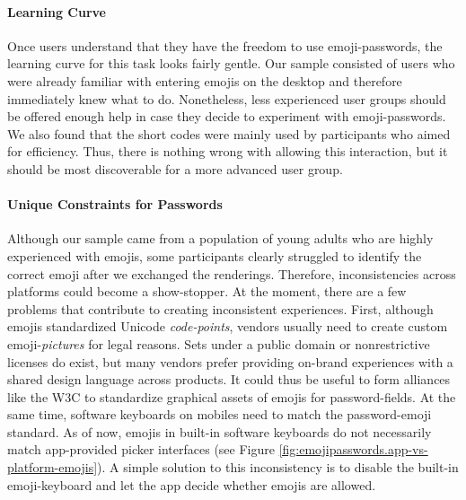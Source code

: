 \paragraph{Learning Curve} Once users understand that they have the freedom to use emoji-passwords, the learning curve for this task looks fairly gentle. Our sample consisted of users who were already familiar with entering emojis on the desktop and therefore immediately knew what to do. Nonetheless, less experienced user groups should be offered enough help in case they decide to experiment with emoji-passwords. We also found that the short codes were mainly used by participants who aimed for efficiency. Thus, there is nothing wrong with allowing this interaction, but it should be most discoverable for a more advanced user group. 


\paragraph{Unique Constraints for Passwords}\label{sec:emojipasswords:unique-constraints} 

Although our sample came from a population of young adults who are highly experienced with emojis, some participants clearly struggled to identify the correct emoji after we exchanged the renderings. Therefore, inconsistencies across platforms could become a show-stopper. At the moment, there are a few problems that contribute to creating inconsistent experiences. 
First, although emojis standardized Unicode \textit{code-points}, vendors usually need to create custom emoji-\textit{pictures} for legal reasons. Sets under a public domain or nonrestrictive licenses do exist, but many vendors prefer providing on-brand experiences with a shared design language across products. It could thus be useful to form alliances like the \gls{W3C} to standardize graphical assets of emojis for password-fields. At the same time, software keyboards on mobiles need to match the password-emoji standard. As of now, emojis in built-in software keyboards do not necessarily match app-provided picker interfaces (see Figure \ref{fig:emojipasswords.app-vs-platform-emojis}). A simple solution to this inconsistency is to disable the built-in emoji-keyboard and let the app decide whether emojis are allowed.

